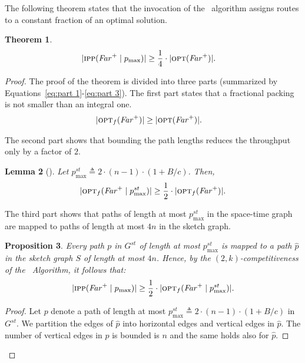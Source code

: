 \documentclass[11pt]{article}
\newtheorem{theorem}{Theorem}
\newtheorem{lemma}[theorem]{Lemma}
\newtheorem{proposition}[theorem]{Proposition}
\newcommand{\route}{\text{\sc{ipp}}}
\newcommand{\IPP}{\route}
\newcommand{\opt}{\text{\textsc{opt}}}
\newcommand{\pmax}{p_{\max}}
\newcommand{\pmaxst}{p_{\max}^{st}}
\newcommand{\eqdf}{\triangleq}
\newenvironment{proof sketch}[1]{\noindent {\emph{Proof sketch of #1:}}}{\hfill \qed}
\newcommand{\far}{\text{\emph{Far}}}
\begin{document}
The following theorem states that the invocation of the \IPP\ algorithm
assigns routes to a constant fraction of an optimal solution.
\begin{theorem}\label{thm:IPP rand}
  \begin{align*}
   | \IPP(\far^+ \mid \pmax) |& \geq \frac 14 \cdot| \opt(\far^+)|.
  \end{align*}
\end{theorem}
\begin{proof}
  The proof of the theorem is divided into three parts (summarized by
  Equations~\eqref{eq:part 1}-\eqref{eq:part 3}).  The first part states that a fractional
  packing is not smaller than an integral one.
  \begin{align}\label{eq:part 1}
    | \opt_f(\far^+)|& \geq | \opt(\far^+)|.
  \end{align}

  The second part shows that bounding the path lengths reduces the throughput only by
  a factor of $2$.
  \begin{lemma}[]\label{lemma:nBline} Let
    $\pmaxst\triangleq 2\cdot (n-1)\cdot (1+B/c)$.  Then,
    \begin{align}
      |\opt_f(\far^+ \mid \pmaxst)| \geq \frac 12 \cdot |\opt_f(\far^+)|.
      \label{eq:part 2}
    \end{align}\end{lemma}

  The third part shows that paths of length at most $\pmaxst$ in the space-time graph
  are mapped to paths of length at most $4n$ in the sketch graph.
  \begin{proposition}\label{prop:4n}
    Every path $p$ in $G^{st}$ of length at most $\pmaxst$ is mapped to a path $\hat
    p$ in the sketch graph $S$ of length at most $4n$. Hence, by the
    $(2,k)$-competitiveness of the \IPP\ Algorithm, it follows that:
    \begin{align}
      \label{eq:part 3}
      | \IPP (\far^+ \mid \pmax)| \geq \frac 12 \cdot |\opt_f(\far^+ \mid \pmaxst)|.
    \end{align}
  \end{proposition}

\begin{proof}
  Let $p$ denote a path of length at most $\pmaxst\eqdf 2\cdot (n-1)\cdot (1+B/c)$ in
  $G^{st}$. We partition the edges of $\hat p$ into horizontal edges and vertical
  edges in $\hat p$.  The number of vertical edges in $p$ is bounded is $n$ and the
  same holds also for $\hat p$.


\end{proof}
\end{proof}
\end{document}
